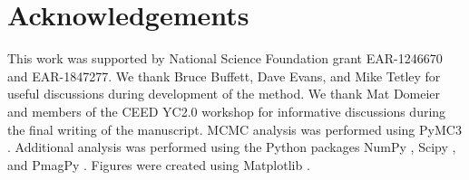 \documentclass[11pt,letterpaper]{article}
\begin{document}



\section*{Acknowledgements}
\label{sec:acknowledgements}
This work was supported by National Science Foundation grant EAR-1246670 and EAR-1847277. We thank Bruce Buffett, Dave Evans, and Mike Tetley for useful discussions during development of the method. We thank Mat Domeier and members of the CEED YC2.0 workshop for informative discussions during the final writing of the manuscript. MCMC analysis was performed using PyMC3 \citep{Salvatier2016a}. Additional analysis was performed using the Python packages NumPy \citep{Harris2020a}, Scipy \citep{Virtanen2020a}, and PmagPy \citep{Tauxe2016a}. Figures were created using Matplotlib \citep{Hunter2007a}.

\clearpage
\newpage
\footnotesize

\singlespacing



\end{document}
